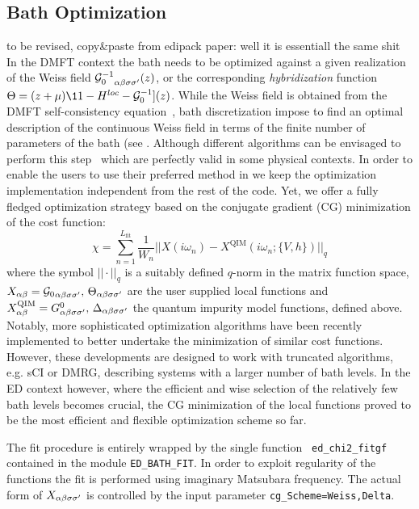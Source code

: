 \documentclass[edipack2.tex]{subfiles}
\begin{document}
\subsection{Bath Optimization}\label{sSecFit}
{\color{red} to be revised, copy\&paste from edipack paper: well it is
  essentiall the same shit} 
In the DMFT context the bath needs to be optimized
against a given realization of the Weiss field
${{\cal G}^{-1}_{0}}_{\alpha\beta\sigma\sigma'}(z)$, or the corresponding {\it hybridization} function
$\Theta = (z + \mu)\11 - H^{loc} -\GG_0^{-1}](z)$. While the Weiss
field is obtained from the DMFT self-consistency
equation~\cite{Georges1996RMP}, bath discretization impose to  find an optimal
description of the continuous Weiss field in terms of the finite
number of parameters of the bath (see .
Although different algorithms can be envisaged to perform this
step~\cite{Garcia2004PRL,Taranto2012PRB} which are perfectly valid in
some physical contexts.
In order to enable the users to use their preferred 
method in \NAME we keep the optimization implementation independent
from the rest of the code. Yet, we offer a fully fledged optimization
strategy based on the  conjugate gradient (CG) minimization of the cost function:
$$
\chi = \sum_{n=1}^{L_\mathrm{fit}}\frac{1}{W_n}||X(i\omega_n) - X^\mathrm{QIM}(i\omega_n;\{V,h\})||_q
$$
where the symbol $|| \cdot ||_q$ is a suitably defined $q$-norm in the
matrix function space, $X_{\alpha\beta}={{\cal G}_{0}}_{\alpha\beta\sigma\sigma'},\,\Theta_{\alpha\beta\sigma\sigma'}$ are the user
supplied local functions and
$X_{\alpha\beta}^\mathrm{QIM}=G^0_{\alpha\beta\sigma\sigma'},\,\Delta_{\alpha\beta\sigma\sigma'}$ the
quantum impurity model functions, defined above.
Notably, more sophisticated optimization algorithms have been
recently implemented to better undertake the minimization of similar
cost functions. However, these developments are designed to work with truncated
algorithms, e.g. sCI or DMRG, describing systems with a larger number of
bath levels.   
In the ED context however, where the efficient and wise selection of
the relatively few bath levels becomes crucial, the CG minimization of
the local functions proved to be the most efficient and
flexible optimization scheme so far. 

The fit procedure is entirely wrapped by the single function {\tt
  ed\_chi2\_fitgf} contained in the module \texttt{ED\_BATH\_FIT}.   
In order to exploit regularity of the functions the fit is 
performed using imaginary Matsubara frequency. 
The actual form of $X_{\alpha\beta\sigma\sigma'}$ is controlled by the input parameter
\texttt{cg\_Scheme=Weiss,Delta}. 
\end{document}
